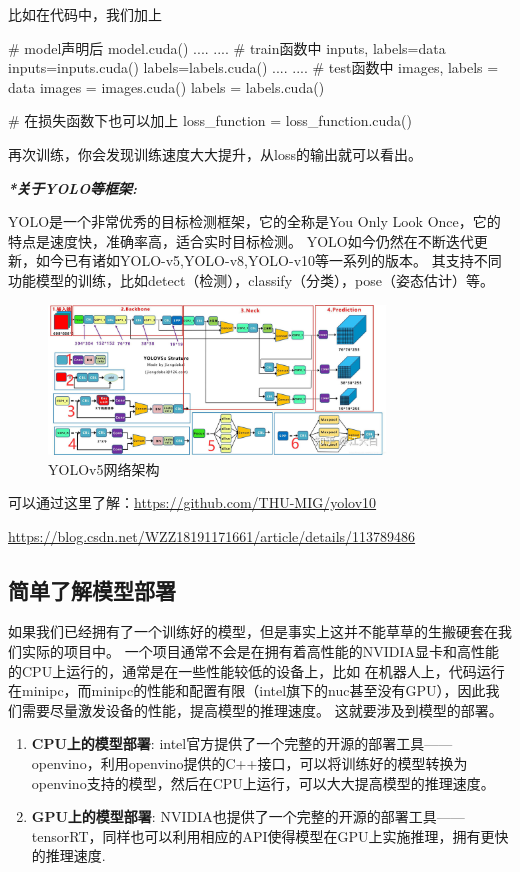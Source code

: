 比如在代码中，我们加上
\begin{tpython}
    # model声明后
    model.cuda()
    ....
    ....
    # train函数中
    inputs, labels=data
    inputs=inputs.cuda()
    labels=labels.cuda()
    ....
    ....
    # test函数中
    images, labels = data
    images = images.cuda()
    labels = labels.cuda()
    
    # 在损失函数下也可以加上
    loss_function = loss_function.cuda()
\end{tpython}
再次训练，你会发现训练速度大大提升，从loss的输出就可以看出。

\textbf{\textit{*关于YOLO等框架:}}

YOLO是一个非常优秀的目标检测框架，它的全称是You Only Look Once，它的特点是速度快，准确率高，适合实时目标检测。
YOLO如今仍然在不断迭代更新，如今已有诸如YOLO-v5,YOLO-v8,YOLO-v10等一系列的版本。
其支持不同功能模型的训练，比如detect（检测），classify（分类），pose（姿态估计）等。

\begin{figure}[H]
    \centering
    \includegraphics[width=0.8\textwidth]{images/YOLOv5.jpeg}
    \caption{YOLOv5网络架构}
    \label{fig:YOLOv5}
\end{figure}

可以通过这里了解：\url{https://github.com/THU-MIG/yolov10}

\url{https://blog.csdn.net/WZZ18191171661/article/details/113789486}

\subsection{简单了解模型部署}
如果我们已经拥有了一个训练好的模型，但是事实上这并不能草草的生搬硬套在我们实际的项目中。
一个项目通常不会是在拥有着高性能的NVIDIA显卡和高性能的CPU上运行的，通常是在一些性能较低的设备上，比如
在机器人上，代码运行在minipc，而minipc的性能和配置有限（intel旗下的nuc甚至没有GPU），因此我们需要尽量激发设备的性能，提高模型的推理速度。
这就要涉及到模型的部署。

\begin{enumerate}
    \item \textbf{CPU上的模型部署}: intel官方提供了一个完整的开源的部署工具——openvino，利用openvino提供的C++接口，可以将训练好的模型转换为openvino支持的模型，然后在CPU上运行，可以大大提高模型的推理速度。
    \item \textbf{GPU上的模型部署}: NVIDIA也提供了一个完整的开源的部署工具——tensorRT，同样也可以利用相应的API使得模型在GPU上实施推理，拥有更快的推理速度.
\end{enumerate}

